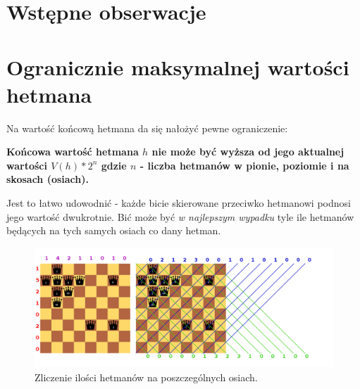 \documentclass{article}
\begin{document}
\clearpage

\section{Wstępne obserwacje}

\section{Ogranicznie maksymalnej wartości hetmana}

Na wartość końcową hetmana da się nałożyć pewne ograniczenie:

\textbf{Końcowa wartość hetmana $h$ nie może być wyższa od jego aktualnej wartości $V(h) * 2^n$ gdzie $n$ - liczba hetmanów w pionie, poziomie i na skosach (osiach).}

Jest to łatwo udowodnić - każde bicie skierowane przeciwko hetmanowi podnosi jego wartość dwukrotnie. Bić może być \textit{w najlepszym wypadku} tyle ile hetmanów będących na tych samych osiach co dany hetman.

\begin{figure}[!ht]
  \centering
      \includegraphics[scale=0.3]{obs1.png}
  \caption{Zliczenie ilości hetmanów na poszczególnych osiach.}
\end{figure}

\clearpage 
\end{document}
